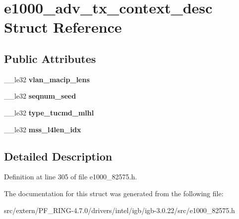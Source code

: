 \hypertarget{structe1000__adv__tx__context__desc}{
\section{e1000\_\-adv\_\-tx\_\-context\_\-desc Struct Reference}
\label{structe1000__adv__tx__context__desc}
}
\subsection*{Public Attributes}
\begin{DoxyCompactItemize}
\item 
\hypertarget{structe1000__adv__tx__context__desc_a7df48e2f879c3ad4d20a9a4430b1c174}{
\_\-\_\-le32 {\bfseries vlan\_\-macip\_\-lens}}
\label{structe1000__adv__tx__context__desc_a7df48e2f879c3ad4d20a9a4430b1c174}

\item 
\hypertarget{structe1000__adv__tx__context__desc_a10af101a60987619d09093ee566f1a1e}{
\_\-\_\-le32 {\bfseries seqnum\_\-seed}}
\label{structe1000__adv__tx__context__desc_a10af101a60987619d09093ee566f1a1e}

\item 
\hypertarget{structe1000__adv__tx__context__desc_ab0d3deeeaa53be2aab881e70b37b4f4a}{
\_\-\_\-le32 {\bfseries type\_\-tucmd\_\-mlhl}}
\label{structe1000__adv__tx__context__desc_ab0d3deeeaa53be2aab881e70b37b4f4a}

\item 
\hypertarget{structe1000__adv__tx__context__desc_a864317881fec759cd1284bdf5eddeb78}{
\_\-\_\-le32 {\bfseries mss\_\-l4len\_\-idx}}
\label{structe1000__adv__tx__context__desc_a864317881fec759cd1284bdf5eddeb78}

\end{DoxyCompactItemize}


\subsection{Detailed Description}


Definition at line 305 of file e1000\_\-82575.h.



The documentation for this struct was generated from the following file:\begin{DoxyCompactItemize}
\item 
src/extern/PF\_\-RING-\/4.7.0/drivers/intel/igb/igb-\/3.0.22/src/e1000\_\-82575.h\end{DoxyCompactItemize}

